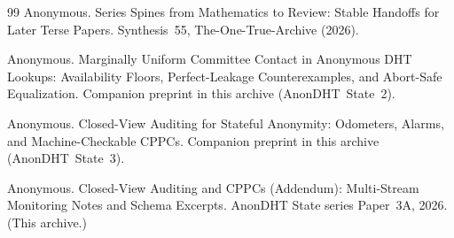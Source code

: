 \documentclass[11pt]{article}
\theoremstyle{definition}
\theoremstyle{remark}
\begin{document}
\begin{thebibliography}{99}
Anonymous.
\newblock Series Spines from Mathematics to Review: Stable Handoffs for Later Terse Papers.
\newblock Synthesis~55, The-One-True-Archive (2026).

Anonymous.
\newblock Marginally Uniform Committee Contact in Anonymous DHT Lookups: Availability Floors, Perfect-Leakage Counterexamples, and Abort-Safe Equalization.
\newblock Companion preprint in this archive (AnonDHT~State~2).

Anonymous.
\newblock Closed-View Auditing for Stateful Anonymity: Odometers, Alarms, and Machine-Checkable CPPCs.
\newblock Companion preprint in this archive (AnonDHT~State~3).

Anonymous.
\newblock Closed-View Auditing and CPPCs (Addendum): Multi-Stream Monitoring Notes and Schema Excerpts.
\newblock AnonDHT State series Paper~3A, 2026. (This archive.)

\end{thebibliography}
\end{document}
